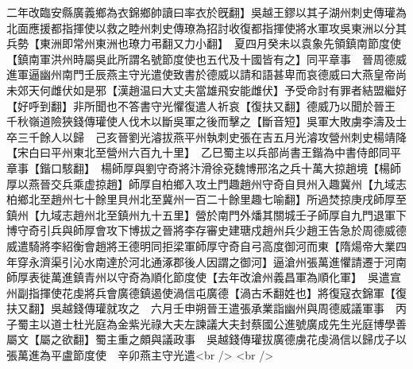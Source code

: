 二年改臨安縣廣義鄉為衣錦鄉帥讀曰率衣於旣翻】吳越王鏐以其子湖州刺史傳瓘為北面應援都指揮使以救之睦州刺史傳璙為招討收復都指揮使將水軍攻吳東洲以分其兵勢【東洲即常州東洲也璙力弔翻又力小翻】　夏四月癸未以袁象先領鎮南節度使【鎮南軍洪州時屬吳此所謂名號節度使也五代及十國皆有之】同平章事　晉周德威進軍逼幽州南門壬辰燕主守光遣使致書於德威以請和語甚卑而哀德威曰大燕皇帝尚未郊天何雌伏如是邪【漢趙温曰大丈夫當雄飛安能雌伏】予受命討有罪者結盟繼好【好呼到翻】非所聞也不答書守光懼復遣人祈哀【復扶又翻】德威乃以聞於晉王　千秋嶺道險狹錢傳瓘使人伐木以斷吳軍之後而擊之【斷音短】吳軍大敗虜李濤及士卒三千餘人以歸　己亥晉劉光濬拔燕平州執刺史張在吉五月光濬攻營州刺史楊靖降【宋白曰平州東北至營州六百九十里】　乙巳蜀主以兵部尚書王鍇為中書侍郎同平章事【鍇口駭翻】　楊師厚與劉守奇將汴滑徐兗魏博邢洺之兵十萬大掠趙境【楊師厚以燕晉交兵乘虚掠趙】師厚自柏鄉入攻土門趣趙州守奇自貝州入趣冀州【九域志柏鄉北至趙州七十餘里貝州北至冀州一百二十餘里趣七喻翻】所過焚掠庚戌師厚至鎮州【九域志趙州北至鎮州九十五里】營於南門外燔其關城壬子師厚自九門退軍下博守奇引兵與師厚會攻下博拔之晉將李存審史建瑭戍趙州兵少趙王告急於周德威德威遣騎將李紹衡會趙將王德明同拒梁軍師厚守奇自弓高度御河而東【隋煬帝大業四年穿永濟渠引沁水南達於河北通涿郡後人因謂之御河】逼滄州張萬進懼請遷于河南師厚表徙萬進鎮青州以守奇為順化節度使【去年改滄州義昌軍為順化軍】　吳遣宣州副指揮使花虔將兵會廣德鎮遏使渦信屯廣德【渦古禾翻姓也】將復寇衣錦軍【復扶又翻】吳越錢傳瓘就攻之　六月壬申朔晉王遣張承業詣幽州與周德威議軍事　丙子蜀主以道士杜光庭為金紫光祿大夫左諫議大夫封蔡國公進號廣成先生光庭博學善屬文【屬之欲翻】蜀主重之頗與議政事　吳越錢傳瓘拔廣德虜花虔渦信以歸戊子以張萬進為平盧節度使　辛卯燕主守光遣<br />
<br />
